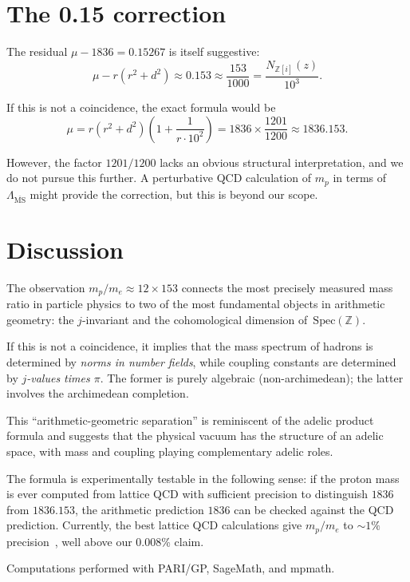 \documentclass[aps,prl,twocolumn,superscriptaddress,nofootinbib]{revtex4-2}
\newcommand{\Z}{\mathbb{Z}}
\newcommand{\Spec}{\mathrm{Spec}}
\begin{document}
\section{The 0.15 correction}

The residual $\mu - 1836 = 0.15267$ is itself suggestive:
\begin{equation}
  \mu - r(r^2 + d^2) \approx 0.153 \approx \frac{153}{1000}
  = \frac{N_{\Z[i]}(z)}{10^3}.
\end{equation}

If this is not a coincidence, the exact formula would be
\begin{equation}
  \mu = r(r^2 + d^2)\left(1 + \frac{1}{r \cdot 10^2}\right)
  = 1836 \times \frac{1201}{1200} \approx 1836.153.
\end{equation}

However, the factor $1201/1200$ lacks an obvious structural
interpretation, and we do not pursue this further.
A perturbative QCD calculation of $m_p$ in terms of $\Lambda_{\overline{\mathrm{MS}}}$
might provide the correction, but this is beyond our scope.

\section{Discussion}

The observation $m_p/m_e \approx 12 \times 153$ connects the most
precisely measured mass ratio in particle physics to two of the most
fundamental objects in arithmetic geometry: the $j$-invariant and
the cohomological dimension of~$\Spec(\Z)$.

If this is not a coincidence, it implies that the mass spectrum
of hadrons is determined by \emph{norms in number fields},
while coupling constants are determined by
\emph{$j$-values times $\pi$}.
The former is purely algebraic (non-archimedean);
the latter involves the archimedean completion.

This ``arithmetic-geometric separation'' is reminiscent of
the adelic product formula and suggests that the physical
vacuum has the structure of an adelic space,
with mass and coupling playing complementary adelic roles.

The formula is experimentally testable in the following sense:
if the proton mass is ever computed from lattice QCD with
sufficient precision to distinguish $1836$ from $1836.153$,
the arithmetic prediction $1836$ can be checked against
the QCD prediction.
Currently, the best lattice QCD calculations give
$m_p / m_e$ to $\sim 1\%$ precision~\cite{BMW2008},
well above our 0.008\% claim.

\begin{acknowledgments}
Computations performed with PARI/GP, SageMath, and mpmath.
\end{acknowledgments}
\end{document}
